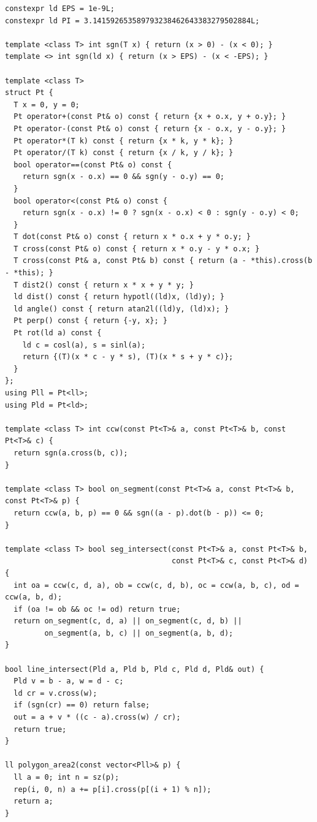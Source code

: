 \begin{lstlisting}
constexpr ld EPS = 1e-9L;
constexpr ld PI = 3.141592653589793238462643383279502884L;

template <class T> int sgn(T x) { return (x > 0) - (x < 0); }
template <> int sgn(ld x) { return (x > EPS) - (x < -EPS); }

template <class T>
struct Pt {
  T x = 0, y = 0;
  Pt operator+(const Pt& o) const { return {x + o.x, y + o.y}; }
  Pt operator-(const Pt& o) const { return {x - o.x, y - o.y}; }
  Pt operator*(T k) const { return {x * k, y * k}; }
  Pt operator/(T k) const { return {x / k, y / k}; }
  bool operator==(const Pt& o) const {
    return sgn(x - o.x) == 0 && sgn(y - o.y) == 0;
  }
  bool operator<(const Pt& o) const {
    return sgn(x - o.x) != 0 ? sgn(x - o.x) < 0 : sgn(y - o.y) < 0;
  }
  T dot(const Pt& o) const { return x * o.x + y * o.y; }
  T cross(const Pt& o) const { return x * o.y - y * o.x; }
  T cross(const Pt& a, const Pt& b) const { return (a - *this).cross(b - *this); }
  T dist2() const { return x * x + y * y; }
  ld dist() const { return hypotl((ld)x, (ld)y); }
  ld angle() const { return atan2l((ld)y, (ld)x); }
  Pt perp() const { return {-y, x}; }
  Pt rot(ld a) const {
    ld c = cosl(a), s = sinl(a);
    return {(T)(x * c - y * s), (T)(x * s + y * c)};
  }
};
using Pll = Pt<ll>;
using Pld = Pt<ld>;

template <class T> int ccw(const Pt<T>& a, const Pt<T>& b, const Pt<T>& c) {
  return sgn(a.cross(b, c));
}

template <class T> bool on_segment(const Pt<T>& a, const Pt<T>& b, const Pt<T>& p) {
  return ccw(a, b, p) == 0 && sgn((a - p).dot(b - p)) <= 0;
}

template <class T> bool seg_intersect(const Pt<T>& a, const Pt<T>& b,
                                      const Pt<T>& c, const Pt<T>& d) {
  int oa = ccw(c, d, a), ob = ccw(c, d, b), oc = ccw(a, b, c), od = ccw(a, b, d);
  if (oa != ob && oc != od) return true;
  return on_segment(c, d, a) || on_segment(c, d, b) ||
         on_segment(a, b, c) || on_segment(a, b, d);
}

bool line_intersect(Pld a, Pld b, Pld c, Pld d, Pld& out) {
  Pld v = b - a, w = d - c;
  ld cr = v.cross(w);
  if (sgn(cr) == 0) return false;
  out = a + v * ((c - a).cross(w) / cr);
  return true;
}

ll polygon_area2(const vector<Pll>& p) {
  ll a = 0; int n = sz(p);
  rep(i, 0, n) a += p[i].cross(p[(i + 1) % n]);
  return a;
}
\end{lstlisting}


